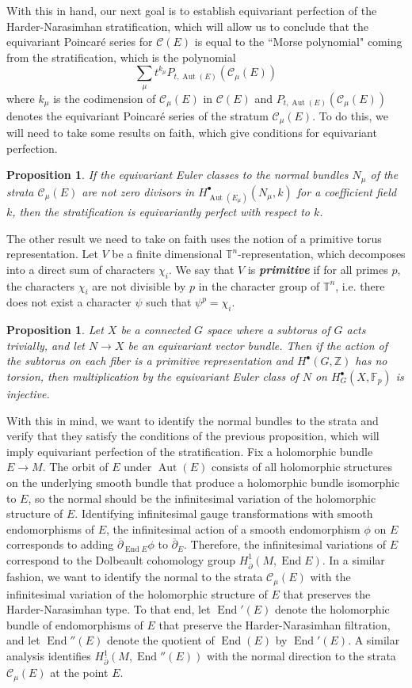 \documentclass[psamsfonts, 12pt]{amsart}
\newtheorem{prop}[thm]{Proposition}
\theoremstyle{definition}
\theoremstyle{remark}
\newcommand{\ib}[1]{\textbf{\textit{#1}}}
\newcommand{\Z}{\mathbb{Z}}
\newcommand{\F}{\mathbb{F}}
\newcommand{\dbar}{\overline{\partial}}
\DeclareMathOperator{\Aut}{Aut}
\DeclareMathOperator{\End}{End}
\begin{document}
With this in hand, our next goal is to establish equivariant perfection of the
Harder-Narasimhan stratification, which will allow us to conclude that the
equivariant Poincar\'e series for $\mathscr{C}(E)$ is equal to the
``Morse polynomial" coming from the stratification, which is the polynomial
\[
\sum_\mu t^{k_\mu} P_{t,\Aut(E)}(\mathscr{C}_\mu(E))
\]
where $k_\mu$ is the codimension of $\mathscr{C}_\mu(E)$ in $\mathscr{C}(E)$
and $P_{t,\Aut(E)}(\mathscr{C}_\mu(E))$ denotes the equivariant Poincar\'e
series of the stratum $\mathscr{C}_\mu(E)$. To do this, we will need to take
some results on faith, which give conditions for equivariant perfection.
%
\begin{prop}
If the equivariant Euler classes to the normal bundles $N_\mu$ of the strata
$\mathscr{C}_\mu(E)$ are not zero divisors in $H^\bullet_{\Aut(E_\mu)}(N_\mu, k)$
for a coefficient field $k$, then the stratification is equivariantly perfect
with respect to $k$.
\end{prop}
%
The other result we need to take on faith uses the notion of a primitive
torus representation. Let $V$ be a finite dimensional $\mathbb{T}^n$-representation,
which decomposes into a direct sum of characters $\chi_i$. We say that $V$ is
\ib{primitive} if for all primes $p$, the characters $\chi_i$ are not divisible
by $p$ in the character group of $\mathbb{T}^n$, i.e. there does not exist a character
$\psi$ such that $\psi^p = \chi_i$.
%
\begin{prop}
Let $X$ be a connected $G$ space where a subtorus of $G$ acts trivially,
and let $N \to X$ be an equivariant vector bundle. Then if the action of the
subtorus on each fiber is a primitive representation and $H^\bullet(G,\Z)$
has no torsion, then multiplication by the equivariant Euler class of
$N$ on $H_G^\bullet(X,\F_p)$ is injective.
\end{prop}
%
With this in mind, we want to identify the normal bundles to the strata and
verify that they satisfy the conditions of the previous proposition, which will
imply equivariant perfection of the stratification. Fix a holomorphic bundle
$E \to M$. The orbit of $E$ under $\Aut(E)$ consists of all holomorphic structures
on the underlying smooth bundle that produce a holomorphic bundle isomorphic to $E$,
so the normal should be the infinitesimal variation of the holomorphic structure
of $E$. Identifying infinitesimal gauge transformations with smooth endomorphisms
of $E$, the infinitesimal action of a smooth endomorphism $\phi$ on $E$
corresponds to adding $\dbar_{\End E}\phi$ to $\dbar_E$. Therefore, the infinitesimal
variations of $E$ correspond to the Dolbeault cohomology group
$H^1_{\dbar}(M,\End E)$. In a similar fashion, we want to identify the normal
to the strata $\mathscr{C}_\mu(E)$ with the infinitesimal variation of the holomorphic
structure of $E$ that preserves the Harder-Narasimhan type. To that end,
let $\End'(E)$ denote the holomorphic bundle of endomorphisms of $E$ that
preserve the Harder-Narasimhan filtration, and let $\End''(E)$ denote the
quotient of $\End(E)$ by $\End'(E)$. A similar analysis identifies
$H^1_{\dbar}(M,\End''(E))$ with the normal direction to the strata
$\mathscr{C}_\mu(E)$ at the point $E$. \\
\end{document}
